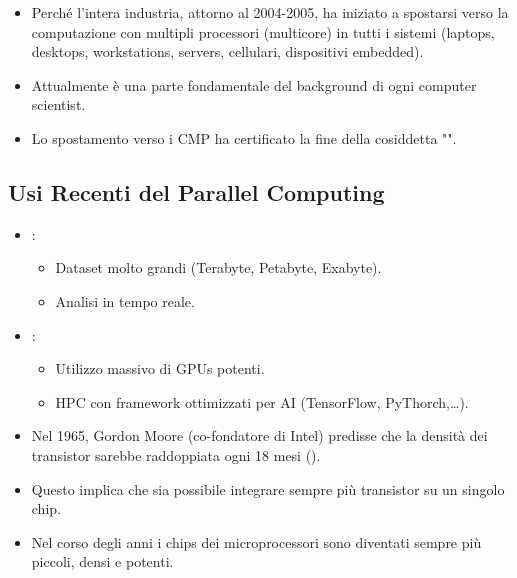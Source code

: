 

\begin{itemize}
  \item Perché l'intera industria, attorno al 2004-2005, ha iniziato a spostarsi verso la computazione con multipli processori (multicore) in tutti i sistemi (laptops, desktops, workstations, servers, cellulari, dispositivi embedded). 
  \item Attualmente è una parte fondamentale del background di ogni computer scientist. 
  \item Lo spostamento verso i CMP ha certificato la fine della cosiddetta "".
\end{itemize}

\subsection{Usi Recenti del Parallel Computing}

\begin{itemize}
  \item {}: 
    \begin{itemize}
      \item Dataset molto grandi (Terabyte, Petabyte, Exabyte). 
      \item Analisi in tempo reale.
    \end{itemize} 
  \item {}:
    \begin{itemize}
      \item Utilizzo massivo di GPUs potenti. 
      \item HPC con framework ottimizzati per AI (TensorFlow, PyThorch,\dots).
    \end{itemize}
  \item Nel 1965, Gordon Moore (co-fondatore di Intel) predisse che la densità dei transistor sarebbe raddoppiata ogni 18 mesi (). 
  \item Questo implica che sia possibile integrare sempre più transistor su un singolo chip. 
  \item Nel corso degli anni i chips dei microprocessori sono diventati sempre più piccoli, densi e potenti.
\end{itemize}

